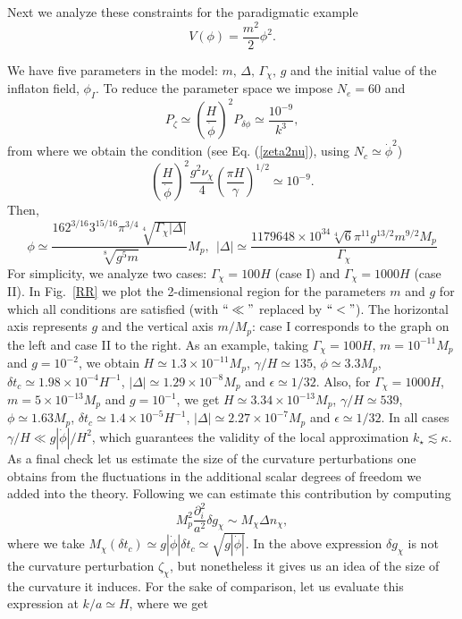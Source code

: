 \documentclass[11pt,amsmath,floats,floatfix,nofootinbib,secnumarabic, superscriptaddress, tightenlines]{revtex4}
\newcommand{\beq}{\begin{equation}}
\newcommand{\eeq}{\end{equation}}
\newcommand{\be}{\begin{equation}}
\newcommand{\ee}{\end{equation}}
\newcommand{\lp}{\left(}
\newcommand{\rp}{\right)}
\begin{document}
{Next we analyze these constraints for the paradigmatic example
\be V(\phi)=\frac{m^2}{2}\phi^2.\ee

We have five parameters in the model: $m,\,\Delta,\,\Gamma_\chi,\,g$ and the initial value of the inflaton field, $\phi_I$. To reduce the parameter space we impose  $N_e=60$ and
\beq
P_{\zeta}\simeq\lp\frac{H}{\dot{\phi}}\rp^2P_{\delta\phi}\simeq \frac{10^{-9}}{k^3},
\eeq from where we obtain the condition (see Eq. (\ref{zeta2nu}), using $N_c \simeq \dot\phi^2$)
\beq\label{E2}
\lp\frac{H}{\dot{\phi}}\rp^2 \frac{g^2\nu_{\chi}}{4}\lp\frac{\pi H}{\gamma}\rp^{1/2}\simeq 10^{-9}.
\eeq
Then,
\begin{equation}\phi \simeq \frac{16 2^{3/16} 3^{15/16} \pi ^{3/4} \sqrt[4]{\Gamma_\chi  |\Delta| }}{\sqrt[8]{g^5 m}} M_p,~~
|\Delta|\simeq\frac{1179648\times 10^{34} \sqrt[4]{6} \pi ^{11} g^{13/2} m^{9/2} M_p}{\Gamma_\chi }
\end{equation}
For simplicity, we analyze two cases: $\Gamma_\chi=100 H$ (case I) and  $\Gamma_\chi=1000 H$ (case II). In Fig.~\ref{RR}  we plot the 2-dimensional region for the parameters $m$ and $g$ for which all conditions are satisfied (with $``\ll"$ replaced by $``<"$). The horizontal axis represents $g$  and the vertical axis  $m/M_p$: case I corresponds to the graph on the left and case II to the right. As an example, taking $\Gamma_\chi=100 H$, $m=10^{-11}M_p$ and $g= 10^{-2}$, we obtain $H\simeq 1.3\times 10^{-11} M_p$, $\gamma/H\simeq  135$, $\phi\simeq 3.3 M_p$,  $\delta t_c \simeq 1.98 \times 10^{-4} H^{-1}$, $|\Delta|\simeq 1.29\times 10^{-8}M_p$ and $\epsilon\simeq 1/32$. Also, for $\Gamma_\chi=1000 H$, $m=5\times 10^{-13}M_p$ and $g= 10^{-1} $, we get $H\simeq 3.34\times 10^{-13} M_p$, $\gamma/H\simeq 539$, $\phi\simeq 1.63 M_p$,  $\delta t_c \simeq 1.4\times 10^{-5} H^{-1}$, $|\Delta|\simeq 2.27\times 10^{-7} M_p$ and $\epsilon\simeq 1/32$. In all cases $\gamma/H \ll g|\dot\phi|/H^2$, which guarantees the validity of the local approximation $k_\star\lesssim \kappa$. As a final check let us estimate the
size of the curvature perturbations one obtains from the fluctuations in the additional scalar degrees of freedom we added into the theory. Following \cite{trapped} we can estimate this contribution by computing
\beq
M_p^2\frac{\partial_i^2}{a^2} \delta g_\chi \sim M_\chi \Delta n_\chi,
\eeq
where we take $M_\chi(\delta t_c) \simeq g |\dot\phi| \delta t_c \simeq \sqrt{g|\dot\phi|}$. In the above expression $\delta g_\chi$ is not the  curvature perturbation $\zeta_\chi$, but nonetheless it gives us an idea of the size of the curvature it induces. For the sake of comparison, let us evaluate this expression at $k/a \simeq H$, where we get
}
\end{document}
